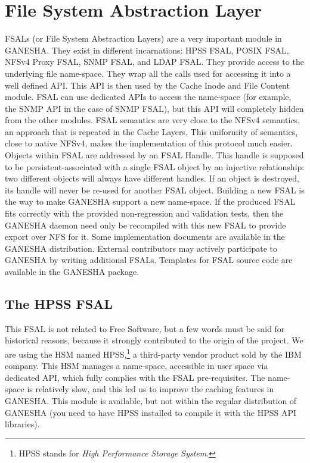 \documentclass[final]{ols}
\begin{document}
\section{File System Abstraction Layer}

FSALs (or File System Abstraction Layers) are a very important module
in GANESHA. They exist in different incarnations: HPSS FSAL, POSIX
FSAL, NFSv4 Proxy FSAL, SNMP FSAL, and LDAP FSAL.  They provide access
to the underlying file name-space. They wrap all the calls used for
accessing it into a well defined API. This API is then used by the
Cache Inode and File Content module. FSAL can use dedicated APIs to
access the name-space (for example, the SNMP API in the case of SNMP FSAL),
but this API will completely hidden from the other modules.  FSAL
semantics are very close to the NFSv4 semantics, an approach that is
repeated in the Cache Layers. This uniformity of semantics, close to
native NFSv4, makes the implementation of this protocol much easier.
Objects within FSAL are addressed by an FSAL Handle. This handle is
supposed to be persistent-associated with a single FSAL object by an
injective relationship: two different objects will always have
different handles. If an object is destroyed, its handle will never be
re-used for another FSAL object.  Building a new FSAL is the way to
make GANESHA support a new name-space. If the produced FSAL fits
correctly with the provided non-regression and validation tests, then
the GANESHA daemon need only be recompiled with this new FSAL to
provide export over NFS for it.  Some implementation documents are
available in the GANESHA distribution. External contributors may
actively participate to GANESHA by writing additional FSALs. Templates
for FSAL source code are available in the GANESHA package.

\subsection{The HPSS FSAL}

This FSAL is not related to Free Software, but a few words must be
said for historical reasons, because it strongly contributed to the
origin of the project.  We are using the HSM named HPSS,\footnote{HPSS
stands for \textit{High Performance Storage System}.} a third-party
vendor product sold by the IBM company.  This HSM manages a
name-space, accessible in user space via dedicated API, which fully
complies with the FSAL pre-requisites. The name-space is relatively slow,
and this led us to improve the caching features in GANESHA. This
module is available, but not within the regular distribution of
GANESHA (you need to have HPSS installed to compile it with the HPSS
API libraries).
\end{document}
